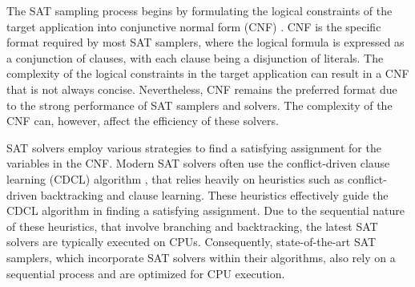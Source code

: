 


The SAT sampling process begins by formulating the logical constraints of the target application into conjunctive normal form (CNF) \cite{Biere2009SAT}.
CNF is the specific format required by most SAT samplers, where the logical formula is expressed as a conjunction of clauses, with each clause being a disjunction of literals.
The complexity of the logical constraints in the target application can result in a CNF that is not always concise. Nevertheless, CNF remains the preferred format due to the strong performance of SAT samplers and solvers. The complexity of the CNF can, however, affect the efficiency of these solvers.

SAT solvers employ various strategies to find a satisfying assignment for the variables in the CNF. Modern SAT solvers \cite{Niklas2003SAT, Moskewicz2001Chaff, Audemard2018Glucose} often use the conflict-driven clause learning (CDCL) algorithm \cite{Silva1996CDCL, silva2021CDCL}, that relies heavily on heuristics such as conflict-driven backtracking and clause learning. These heuristics effectively guide the CDCL algorithm in finding a satisfying assignment. Due to the sequential nature of these heuristics, that involve branching and backtracking, the latest SAT solvers are typically executed on CPUs. Consequently, state-of-the-art SAT samplers, which incorporate SAT solvers within their algorithms, also rely on a sequential process and are optimized for CPU execution.

